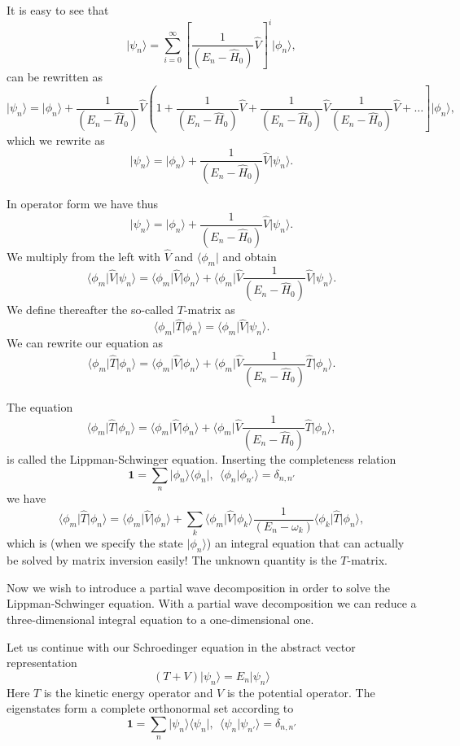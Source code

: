 \documentclass[%
oneside,                 %
final,                   %
10pt]{article}
\begin{document}
It is easy to see that 
\[
\vert \psi_n \rangle =\sum_{i=0}^{\infty}\left[\frac{1}{(E_n -\hat{H}_0)}\hat{V}\right]^i\vert \phi_n \rangle,
\]
can be rewritten as 
\[
\vert \psi_n \rangle =\vert\phi_n \rangle+\frac{1}{( E_n -\hat{H}_0)}
\hat{V}\left(1+ \frac{1}{(E_n -\hat{H}_0)}\hat{V}+\frac{1}{(E_n -\hat{H}_0)}\hat{V}\frac{1}{(E_n -\hat{H}_0)}\hat{V}+\dots\right]\vert \phi_n \rangle,
\]
which we rewrite as 
\[
\vert \psi_n \rangle =\vert\phi_n \rangle+\frac{1}{(E_n -\hat{H}_0)}\hat{V}\vert \psi_n \rangle.
\]

In operator form we have thus
\[
\vert \psi_n \rangle =\vert\phi_n \rangle+\frac{1}{(E_n -\hat{H}_0)}\hat{V}\vert \psi_n \rangle.
\]
We multiply from the left with $\hat{V}$ and $\langle \phi_m \vert$ and obtain
\[
\langle \phi_m \vert\hat{V}\vert \psi_n \rangle =\langle \phi_m \vert\hat{V}\vert\phi_n \rangle+\langle \phi_m \vert\hat{V}\frac{1}{(E_n -\hat{H}_0)}\hat{V}\vert \psi_n \rangle.
\]
We define thereafter the so-called $T$-matrix as
\[
\langle \phi_m \vert\hat{T}\vert \phi_n \rangle=\langle \phi_m \vert\hat{V}\vert \psi_n \rangle.
\]
We can rewrite our equation as
\[
\langle \phi_m \vert\hat{T}\vert \phi_n \rangle =\langle \phi_m \vert\hat{V}\vert\phi_n \rangle+\langle \phi_m \vert\hat{V}\frac{1}{(E_n -\hat{H}_0)}\hat{T}\vert \phi_n \rangle.
\]

The equation
\[
\langle \phi_m \vert\hat{T}\vert \phi_n \rangle =\langle \phi_m \vert\hat{V}\vert\phi_n \rangle+\langle \phi_m \vert\hat{V}\frac{1}{(E_n -\hat{H}_0)}\hat{T}\vert \phi_n \rangle,
\]
is called the Lippman-Schwinger equation. Inserting the completeness relation
\[ 
\mathbf{1} = \sum_n \vert \phi_n\rangle\langle \phi_n \vert, \:\: \langle \phi_n\vert \phi_{n'} \rangle = \delta_{n,n'}
\]
we have 
\[
\langle \phi_m \vert\hat{T}\vert \phi_n \rangle =\langle \phi_m \vert\hat{V}\vert\phi_n \rangle+\sum_k \langle \phi_m \vert\hat{V}\vert \phi_k\rangle\frac{1}{(E_n -\omega_k)}\langle \phi_k \vert\hat{T}\vert \phi_n \rangle,
\]
which is (when we specify the state $\vert\phi_n \rangle$) an integral equation that can actually be solved by matrix inversion easily! The unknown quantity is the $T$-matrix.

Now we wish to introduce a partial wave decomposition in order to solve the Lippman-Schwinger equation. With a partial wave decomposition we can reduce a three-dimensional integral equation to a one-dimensional one. 

Let us continue with our Schroedinger equation in the abstract vector representation
\[
\left(T + V\right)\vert\psi_n\rangle = E_n\vert\psi_n \rangle 
\]
Here $T$ is the kinetic energy operator and $V$ is the potential operator. 
The eigenstates form a complete orthonormal set according to 
\[ 
\mathbf{1}=\sum_n\vert\psi_n\rangle\langle\psi_n\vert, \:\: \langle\psi_n\vert\psi_{n'}\rangle =\delta_{n,n'}
\]
\end{document}
